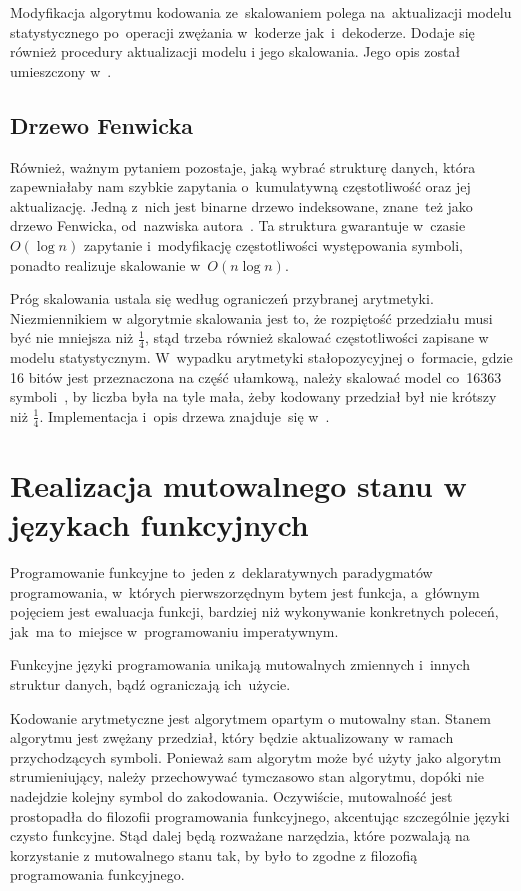 \documentclass[../../praca.tex]{subfiles}
\begin{document}
Modyfikacja algorytmu kodowania ze~skalowaniem polega na~aktualizacji
modelu statystycznego po~operacji zwężania w~koderze jak~i~dekoderze.
Dodaje się również procedury aktualizacji modelu i jego skalowania.
Jego opis został umieszczony w~\cite{Sayood:IDC}.

\subsection{Drzewo Fenwicka}

Również, ważnym pytaniem pozostaje, jaką wybrać strukturę danych, która
zapewniałaby nam szybkie zapytania o~kumulatywną częstotliwość oraz
jej aktualizację. Jedną z~nich jest binarne drzewo indeksowane, 
znane~też jako drzewo Fenwicka, od~nazwiska autora~\cite{Fenwick:FT}.
Ta struktura gwarantuje w~czasie~\( O (\log n) \) zapytanie i~modyfikację
częstotliwości występowania symboli, ponadto realizuje skalowanie w~\( O (n \log n) \).

Próg skalowania ustala się według ograniczeń przybranej arytmetyki. 
Niezmiennikiem w algorytmie skalowania jest to, że rozpiętość
przedziału musi być nie mniejsza niż \( \frac{1}{4} \), stąd
trzeba również skalować częstotliwości zapisane w modelu statystycznym.
W~wypadku arytmetyki stałopozycyjnej o~formacie, gdzie 16 bitów jest przeznaczona 
na część ułamkową, należy skalować
model co~16363 symboli~\cite{Fenwick:FT}, by liczba była na tyle mała, żeby
kodowany przedział był nie krótszy niż \( \frac{1}{4} \).
Implementacja i~opis drzewa znajduje~się w~\cite{Fenwick:FT}.

\section{Realizacja mutowalnego stanu w językach funkcyjnych}

Programowanie funkcyjne to~jeden z~deklaratywnych paradygmatów programowania,
w~których pierwszorzędnym bytem jest funkcja, a~głównym pojęciem
jest ewaluacja funkcji, bardziej niż wykonywanie konkretnych poleceń,
jak~ma to~miejsce w~programowaniu imperatywnym.~\cite{Hudak:Conception}

Funkcyjne języki programowania unikają mutowalnych zmiennych i~innych 
struktur danych, bądź ograniczają ich~użycie.

Kodowanie arytmetyczne jest algorytmem opartym o mutowalny stan.
Stanem algorytmu jest zwężany przedział, który będzie aktualizowany
w ramach przychodzących symboli. Ponieważ sam algorytm może być użyty
jako algorytm strumieniujący, należy przechowywać tymczasowo stan algorytmu,
dopóki nie nadejdzie kolejny symbol do zakodowania. Oczywiście, mutowalność
jest prostopadła do filozofii programowania funkcyjnego, akcentując szczególnie
języki czysto funkcyjne. Stąd dalej będą rozważane narzędzia, które pozwalają
na korzystanie z mutowalnego stanu tak, by było to zgodne z filozofią programowania
funkcyjnego.
\end{document}
